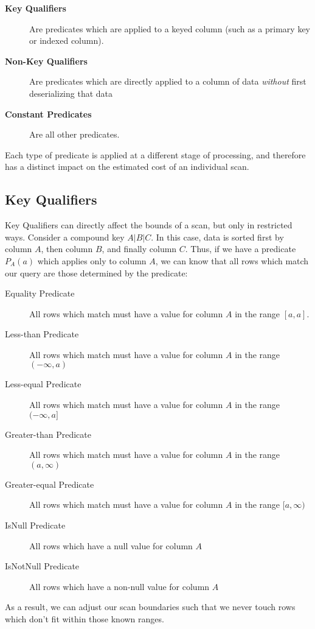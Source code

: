 \documentclass[10pt]{amsart}
\begin{document}
 \begin{description}
				 \item[\textbf{Key Qualifiers}] Are predicates which are applied to a keyed column (such as a primary key or indexed column).
				 \item[\textbf{Non-Key Qualifiers}] Are predicates which are directly applied to a column of data \emph{without} first deserializing that data
				 \item[\textbf{Constant Predicates}] Are all other predicates.
 \end{description}

Each type of predicate is applied at a different stage of processing, and therefore has a distinct impact on the estimated cost of an individual scan. 

\subsection{Key Qualifiers}
Key Qualifiers can directly affect the bounds of a scan, but only in restricted ways. Consider a compound key $A|B|C$. In this case, data is sorted first by column $A$, then column $B$, and finally column $C$. Thus, if we have a predicate $P_A(a)$ which applies only to column $A$, we can know that all rows which match our query are those determined by the predicate:

\begin{description}
				\item[Equality Predicate] All rows which match must have a value for column $A$ in the range $[a,a]$.
				\item[Less-than Predicate] All rows which match must have a value for column $A$ in the range $(-\infty,a)$
				\item[Less-equal Predicate] All rows which match must have a value for column $A$ in the range $(-\infty,a]$
				\item[Greater-than Predicate] All rows which match must have a value for column $A$ in the range $(a,\infty)$
				\item[Greater-equal Predicate] All rows which match must have a value for column $A$ in the range $[a,\infty)$
				\item[IsNull Predicate] All rows which have a null value for column $A$
				\item[IsNotNull Predicate] All rows which have a non-null value for column $A$
\end{description}

As a result, we can adjust our scan boundaries such that we never touch rows which don't fit within those known ranges.
\end{document}

